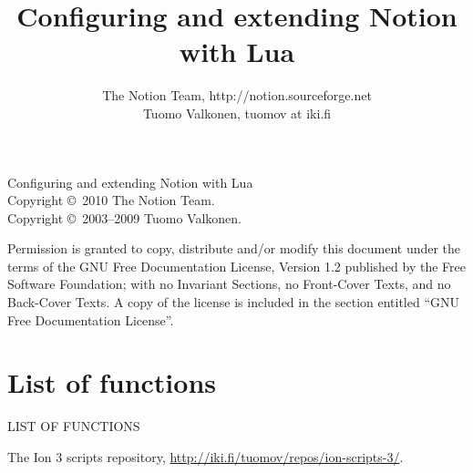 \documentclass[english,a4paper,11pt,oldtoc,mctitle]{rapport3}
\title{Configuring and extending Notion with Lua}
\author{The Notion Team, http://notion.sourceforge.net \\ Tuomo Valkonen, tuomov at iki.fi}
\begin{document}
\maketitle

Configuring and extending Notion with Lua\\
Copyright \copyright\  2010 The Notion Team.\\
Copyright \copyright\  2003--2009 Tuomo Valkonen.

Permission is granted to copy, distribute and/or modify this document
under the terms of the GNU Free Documentation License, Version 1.2
published by the Free Software Foundation;
with no Invariant Sections, no Front-Cover Texts, and no Back-Cover Texts.
A copy of the license is included in the section entitled ``GNU
Free Documentation License''.

\tableofcontents













\appendix





\chapter*{List of functions}
%
         {\MakeUppercase{List of functions}}%

\makeatletter
\def\fnlisti#1{\@dottedtocline{1}{0em}{1.5em}{\lstinline!#1!}{\pageref{fn:#1}}}
{\parskip\z@}
\makeatother

\begin{htmlonly}
\newcommand{\fnlisti}[1]{\fnref{#1}\\}

\end{htmlonly}

\printindex

\begin{thebibliography}{9}
     The Ion 3 scripts repository,
        \url{http://iki.fi/tuomov/repos/ion-scripts-3/}.
\end{thebibliography}
\end{document}
